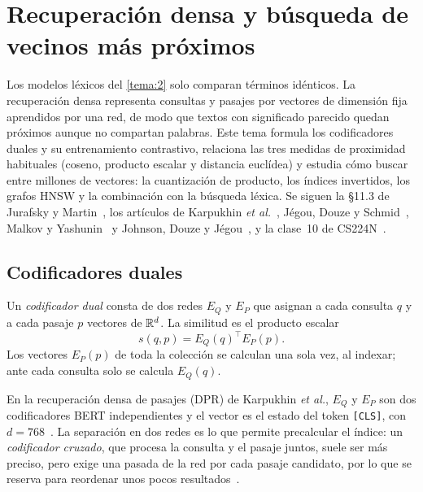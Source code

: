 \chapter{Recuperación densa y búsqueda de vecinos más próximos}
\label{tema:4}

Los modelos léxicos del \cref{tema:2} solo comparan términos idénticos. La recuperación densa representa consultas y pasajes por vectores de dimensión fija aprendidos por una red, de modo que textos con significado parecido quedan próximos aunque no compartan palabras. Este tema formula los codificadores duales y su entrenamiento contrastivo, relaciona las tres medidas de proximidad habituales (coseno, producto escalar y distancia euclídea) y estudia cómo buscar entre millones de vectores: la cuantización de producto, los índices invertidos, los grafos HNSW y la combinación con la búsqueda léxica. Se siguen la §11.3 de Jurafsky y Martin~\cite{jm3}, los artículos de Karpukhin \emph{et al.}~\cite{dpr}, Jégou, Douze y Schmid~\cite{jegou}, Malkov y Yashunin~\cite{hnsw} y Johnson, Douze y Jégou~\cite{faiss}, y la clase~10 de CS224N~\cite{cs224n}.

\section{Codificadores duales}

\begin{definicion}\label{def:biencoder}
Un \emph{codificador dual} consta de dos redes $E_Q$ y $E_P$ que asignan a cada consulta $q$ y a cada pasaje $p$ vectores de $\mathbb{R}^{d}$. La similitud es el producto escalar
\[
s(q,p)=E_Q(q)^{\top}E_P(p).
\]
Los vectores $E_P(p)$ de toda la colección se calculan una sola vez, al indexar; ante cada consulta solo se calcula $E_Q(q)$.
\end{definicion}

En la recuperación densa de pasajes (DPR) de Karpukhin \emph{et al.}, $E_Q$ y $E_P$ son dos codificadores BERT independientes y el vector es el estado del token \texttt{[CLS]}, con $d=768$~\cite{dpr}. La separación en dos redes es lo que permite precalcular el índice: un \emph{codificador cruzado}, que procesa la consulta y el pasaje juntos, suele ser más preciso, pero exige una pasada de la red por cada pasaje candidato, por lo que se reserva para reordenar unos pocos resultados~\cite[§11.3]{jm3}.

